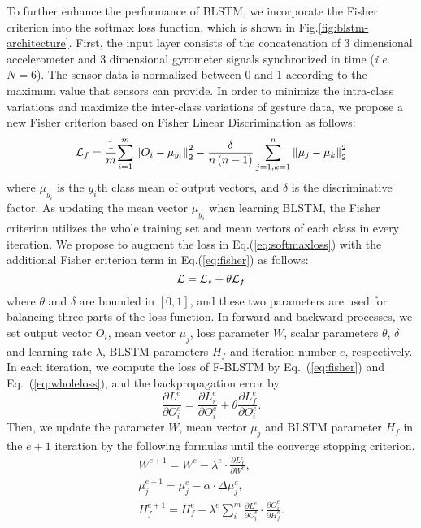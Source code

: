 \documentclass[review]{elsarticle}
\begin{document}
To further enhance the performance of BLSTM, we incorporate the Fisher criterion into the softmax loss function, which is shown in Fig.\;\ref{fig:blstm-architecture}. First, the input layer consists of the concatenation of 3 dimensional accelerometer and 3 dimensional gyrometer signals synchronized in time (\emph{i.e.} $N=6$). The sensor data is normalized between 0 and 1 according to the maximum value that sensors can provide.
In order to minimize the intra-class variations and maximize the inter-class variations of gesture data, we propose a new Fisher criterion based on Fisher Linear Discrimination as follows:
\begin{equation}
	{\cal L}_f
	= \frac{1}{m}{\sum\limits_{i = 1}^m {\left\| {{O_i} - {\mu_{{y_i}}}} \right\|_2^2}  - \frac{\delta}{n\left(n-1\right)} \sum\limits_{j = 1,k = 1}^n {\left\| {{\mu_j} - {\mu_k}} \right\|_2^2} }
	\label{eq:fisher}
\end{equation}
where ${\mu_{{y_i}}}$ is the $y_i$th class mean of output vectors, and $\delta$ is the discriminative factor. As updating the mean vector ${\mu_{{y_i}}}$ when learning BLSTM, the Fisher criterion utilizes the whole training set and mean vectors of each class in every iteration. We propose to augment the loss in Eq.\;(\ref{eq:softmaxloss}) with the additional Fisher criterion term in Eq.\;(\ref{eq:fisher}) as follows:
\begin{equation}
{\cal L} 
	= {\cal L}_s +\theta{\cal L}_f \\
\label{eq:wholeloss}
\end{equation}
where $\theta$ and $\delta$ are bounded in $[0,1]$, and these two parameters are used for balancing three parts of the loss function. In forward and backward processes, we set output vector ${O_i}$, mean vector ${\mu_j}$, loss parameter $W$, scalar parameters $\theta$, $\delta$ and learning rate $\lambda$, BLSTM parameters $H_f$ and iteration number $e$, respectively. In each iteration, we compute the loss of F-BLSTM by Eq.~(\ref{eq:fisher}) and Eq.~(\ref{eq:wholeloss}), and the backpropagation error by
\begin{equation}
	\frac{{\partial {L^e}}}{{\partial O_i^e}} = \frac{{\partial L_s^e}}{{\partial O_i^e}} + \theta \frac{{\partial L_f^e}}{{\partial O_i^e}}.
	\label{eq:backerror}
\end{equation}
Then, we update the parameter $W$, mean vector $\mu_{j}$ and BLSTM parameter $H_f$ in the $e+1$ iteration by the following formulas until the converge stopping criterion.
\begin{equation}
	\begin{array}{l}
	{W^{e + 1}} = {W^e} - {\lambda ^e} \cdot \frac{{\partial L_f^e}}{{\partial {W^e}}},\\
	\mu _j^{e + 1} = \mu _j^e - \alpha  \cdot \Delta \mu _j^e,\\
	H_f^{e + 1} = H_f^e - {\lambda ^e}\sum\nolimits_i^m {\frac{{\partial {L^e}}}{{\partial O_i^e}}}  \cdot \frac{{\partial O_i^e}}{{\partial H_f^e}}.
	\end{array}
	\label{eq:parmean}
\end{equation}
\end{document}
